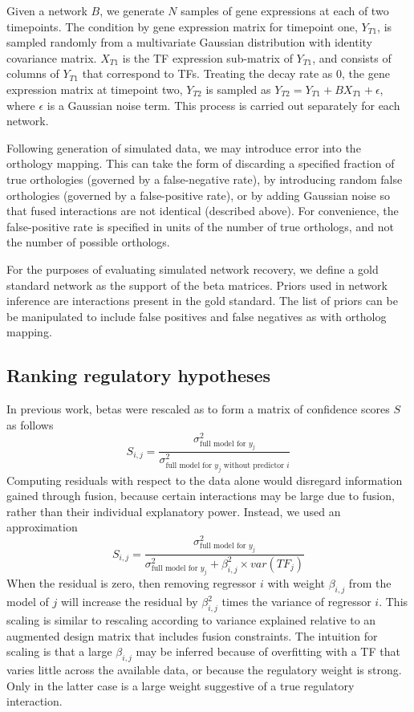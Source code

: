 \documentclass[11pt]{article}
\begin{document}
Given a network $B$, we generate $N$ samples of gene expressions at each of two timepoints. The condition by gene expression matrix for timepoint one, $Y_{T1}$, is sampled randomly from a multivariate Gaussian distribution with identity covariance matrix. $X_{T1}$ is the TF expression sub-matrix of $Y_{T1}$, and consists of columns of $Y_{T1}$ that correspond to TFs. Treating the decay rate as 0, the gene expression matrix at timepoint two, $Y_{T2}$ is sampled as $Y_{T2} = Y_{T1} + BX_{T1} + \epsilon$, where $\epsilon$ is a Gaussian noise term. This process is carried out separately for each network. 

Following generation of simulated data, we may introduce error into the orthology mapping. This can take the form of discarding a specified fraction of true orthologies (governed by a false-negative rate), by introducing random false orthologies (governed by a false-positive rate), or by adding Gaussian noise so that fused interactions are not identical (described above). For convenience, the false-positive rate is specified in units of the number of true orthologs, and not the number of possible orthologs. 

For the purposes of evaluating simulated network recovery, we define a gold standard network as the support of the beta matrices. Priors used in network inference are interactions present in the gold standard. The list of priors can be be manipulated to include false positives and false negatives as with ortholog mapping. 

\subsection{Ranking regulatory hypotheses}
In previous work, betas were rescaled as to form a matrix of confidence scores $S$ as follows
\begin{equation}
S_{i,j} = \frac{\sigma^2_{\text{full model for }y_j}}{\sigma^2_{\text{full model for }y_j \text{ without predictor }i}}
\end{equation}
Computing residuals with respect to the data alone would disregard information gained through fusion, because certain interactions may be large due to fusion, rather than their individual explanatory power. Instead, we used an approximation
\begin{equation}
S_{i,j} = \frac{\sigma^2_{\text{full model for }y_j}}{\sigma^2_{\text{full model for }y_j} + \beta_{i,j}^2 \times var(TF_j)}
\end{equation}
When the residual is zero, then removing regressor $i$ with weight $\beta_{i,j}$ from the model of $j$ will increase the residual by $\beta_{i,j}^2$ times the variance of regressor $i$. This scaling is similar to rescaling according to variance explained relative to an augmented design matrix that includes fusion constraints. The intuition for scaling is that a large $\beta_{i,j}$ may be inferred because of overfitting with a TF that varies little across the available data, or because the regulatory weight is strong. Only in the latter case is a large weight suggestive of a true regulatory interaction.
\end{document}
